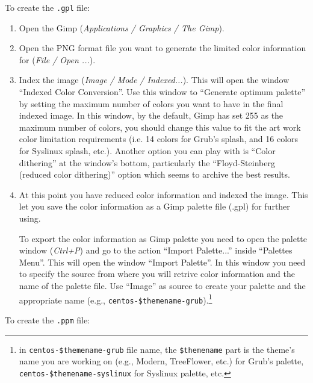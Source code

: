 To create the \texttt{.gpl} file:

\begin{enumerate}

\item Open the Gimp (\textit{Applications / Graphics / The Gimp}).

\item Open the PNG format file you want to generate the limited color
information for (\textit{File / Open ...}).

\item Index the image (\textit{Image / Mode / Indexed...}).  This will
open the window ``Indexed Color Conversion''. Use this window to
``Generate optimum palette'' by setting the maximum number of colors
you want to have in the final indexed image. In this window, by the
default, Gimp has set 255 as the maximum number of colors, you should
change this value to fit the art work color limitation requirements
(i.e. 14 colors for Grub's splash, and 16 colors for Syslinux splash,
etc.). Another option you can play with is ``Color dithering'' at the
window's bottom, particularly the ``Floyd-Steinberg (reduced color
dithering)'' option which seems to archive the best results.

\item At this point you have reduced color information and indexed the
image. This let you save the color information as a Gimp palette file
(.gpl) for further using. 

To export the color information as Gimp palette you need to open the
palette window (\textit{Ctrl+P}) and go to the action ``Import
Palette...'' inside ``Palettes Menu''. This will open the window
``Import Palette''. In this window you need to specify the source from
where you will retrive color information and the name of the palette
file. Use ``Image'' as source to create your palette and the
appropriate name (e.g., \texttt{centos-\$themename-grub}).\footnote{in
\texttt{centos-\$themename-grub} file name, the \texttt{\$themename}
part is the theme's name you are working on (e.g., Modern, TreeFlower,
etc.) for Grub's palette, \texttt{centos-\$themename-syslinux} for
Syslinux palette, etc.}

\end{enumerate}

To create the \texttt{.ppm} file:

